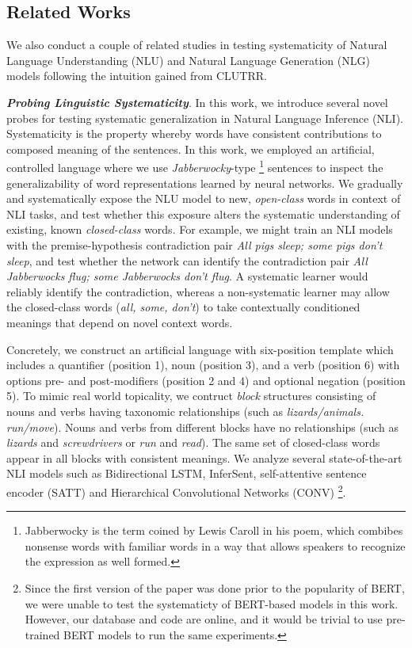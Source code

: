 \documentclass[12pt]{article}
\newcommand{\xhdr}[1]{{\noindent\bfseries #1}.}
\begin{document}
\subsection{Related Works}

We also conduct a couple of related studies in testing systematicity of Natural Language Understanding (NLU) and Natural Language Generation (NLG) models following the intuition gained from CLUTRR.

\xhdr{\textit{Probing Linguistic Systematicity}} \cite{goodwin2020} In this work, we introduce several novel probes for testing systematic generalization in Natural Language Inference (NLI). Systematicity is the property whereby words have consistent contributions to composed meaning of the sentences. In this work, we employed an artificial, controlled language where we use \textit{Jabberwocky}-type \footnote{Jabberwocky is the term coined by Lewis Caroll in his poem, which combibes nonsense words with familiar words in a way that allows speakers to recognize the expression as well formed.} sentences to inspect the generalizability of word representations learned by neural networks. We gradually and systematically expose the NLU model to new, \textit{open-class} words in context of NLI tasks, and test whether this exposure alters the systematic understanding of existing, known \textit{closed-class} words. For example, we might train an NLI models with the premise-hypothesis contradiction pair \textit{All pigs sleep; some pigs don't sleep}, and test whether the network can identify the contradiction pair \textit{All Jabberwocks flug; some Jabberwocks don't flug}. A systematic learner would reliably identify the contradiction, whereas a non-systematic learner may allow the closed-class words (\textit{all, some, don't}) to take contextually conditioned meanings that depend on novel context words.



Concretely, we construct an artificial language with six-position template which includes a quantifier (position 1), noun (position 3), and a verb (position 6) with options pre- and post-modifiers (position 2 and 4) and optional negation (position 5). To mimic real world topicality, we contruct \textit{block} structures consisting of nouns and verbs having taxonomic relationships (such as \textit{lizards/animals. run/move}). Nouns and verbs from different blocks have no relationships (such as \textit{lizards} and \textit{screwdrivers} or \textit{run} and \textit{read}). The same set of closed-class words appear in all blocks with consistent meanings. We analyze several state-of-the-art NLI models such as Bidirectional LSTM, InferSent, self-attentive sentence encoder (SATT) and Hierarchical Convolutional Networks (CONV) \footnote{Since the first version of the paper was done prior to the popularity of BERT, we were unable to test the systematicty of BERT-based models in this work. However, our database and code are online, and it would be trivial to use pre-trained BERT models to run the same experiments.}.
\end{document}
